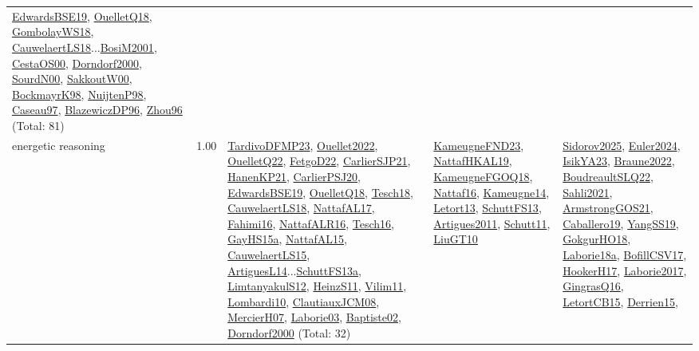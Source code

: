 {\begin{longtable}{p{3cm}r>{\raggedright\arraybackslash}p{6cm}>{\raggedright\arraybackslash}p{6cm}>{\raggedright\arraybackslash}p{8cm}}
\hyperref[detail:EdwardsBSE19]{EdwardsBSE19}, \hyperref[detail:OuelletQ18]{OuelletQ18}, \hyperref[detail:GombolayWS18]{GombolayWS18}, \hyperref[detail:CauwelaertLS18]{CauwelaertLS18}...\hyperref[detail:BosiM2001]{BosiM2001}, \hyperref[detail:CestaOS00]{CestaOS00}, \hyperref[detail:Dorndorf2000]{Dorndorf2000}, \hyperref[detail:SourdN00]{SourdN00}, \hyperref[detail:SakkoutW00]{SakkoutW00}, \hyperref[detail:BockmayrK98]{BockmayrK98}, \hyperref[detail:NuijtenP98]{NuijtenP98}, \hyperref[detail:Caseau97]{Caseau97}, \hyperref[detail:BlazewiczDP96]{BlazewiczDP96}, \hyperref[detail:Zhou96]{Zhou96} (Total: 81)\\
\index{energetic reasoning}\index{Algorithms!energetic reasoning}energetic reasoning &  1.00 & \hyperref[detail:TardivoDFMP23]{TardivoDFMP23}, \hyperref[detail:Ouellet2022]{Ouellet2022}, \hyperref[detail:OuelletQ22]{OuelletQ22}, \hyperref[detail:FetgoD22]{FetgoD22}, \hyperref[detail:CarlierSJP21]{CarlierSJP21}, \hyperref[detail:HanenKP21]{HanenKP21}, \hyperref[detail:CarlierPSJ20]{CarlierPSJ20}, \hyperref[detail:EdwardsBSE19]{EdwardsBSE19}, \hyperref[detail:OuelletQ18]{OuelletQ18}, \hyperref[detail:Tesch18]{Tesch18}, \hyperref[detail:CauwelaertLS18]{CauwelaertLS18}, \hyperref[detail:NattafAL17]{NattafAL17}, \hyperref[detail:Fahimi16]{Fahimi16}, \hyperref[detail:NattafALR16]{NattafALR16}, \hyperref[detail:Tesch16]{Tesch16}, \hyperref[detail:GayHS15a]{GayHS15a}, \hyperref[detail:NattafAL15]{NattafAL15}, \hyperref[detail:CauwelaertLS15]{CauwelaertLS15}, \hyperref[detail:ArtiguesL14]{ArtiguesL14}...\hyperref[detail:SchuttFS13a]{SchuttFS13a}, \hyperref[detail:LimtanyakulS12]{LimtanyakulS12}, \hyperref[detail:HeinzS11]{HeinzS11}, \hyperref[detail:Vilim11]{Vilim11}, \hyperref[detail:Lombardi10]{Lombardi10}, \hyperref[detail:ClautiauxJCM08]{ClautiauxJCM08}, \hyperref[detail:MercierH07]{MercierH07}, \hyperref[detail:Laborie03]{Laborie03}, \hyperref[detail:Baptiste02]{Baptiste02}, \hyperref[detail:Dorndorf2000]{Dorndorf2000} (Total: 32) & \hyperref[detail:KameugneFND23]{KameugneFND23}, \hyperref[detail:NattafHKAL19]{NattafHKAL19}, \hyperref[detail:KameugneFGOQ18]{KameugneFGOQ18}, \hyperref[detail:Nattaf16]{Nattaf16}, \hyperref[detail:Kameugne14]{Kameugne14}, \hyperref[detail:Letort13]{Letort13}, \hyperref[detail:SchuttFS13]{SchuttFS13}, \hyperref[detail:Artigues2011]{Artigues2011}, \hyperref[detail:Schutt11]{Schutt11}, \hyperref[detail:LiuGT10]{LiuGT10} & \hyperref[detail:Sidorov2025]{Sidorov2025}, \hyperref[detail:Euler2024]{Euler2024}, \hyperref[detail:IsikYA23]{IsikYA23}, \hyperref[detail:Braune2022]{Braune2022}, \hyperref[detail:BoudreaultSLQ22]{BoudreaultSLQ22}, \hyperref[detail:Sahli2021]{Sahli2021}, \hyperref[detail:ArmstrongGOS21]{ArmstrongGOS21}, \hyperref[detail:Caballero19]{Caballero19}, \hyperref[detail:YangSS19]{YangSS19}, \hyperref[detail:GokgurHO18]{GokgurHO18}, \hyperref[detail:Laborie18a]{Laborie18a}, \hyperref[detail:BofillCSV17]{BofillCSV17}, \hyperref[detail:HookerH17]{HookerH17}, \hyperref[detail:Laborie2017]{Laborie2017}, \hyperref[detail:GingrasQ16]{GingrasQ16}, \hyperref[detail:LetortCB15]{LetortCB15}, \hyperref[detail:Derrien15]{Derrien15}, 
\end{longtable}}
